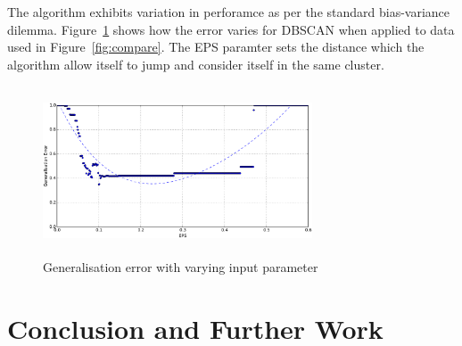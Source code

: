 \documentclass{ecsarticle}     %
\begin{document}
The algorithm exhibits variation in perforamce as per the standard bias-variance dilemma.
Figure~\ref{fig:error} shows how the error varies for DBSCAN when applied to data used in Figure~\ref{fig:compare}.
The EPS paramter sets the distance which the algorithm allow itself to jump and consider itself in the same cluster.

\begin{figure}[ht]
   \centering
    \includegraphics[height = 5cm,width = 8cm]{error.pdf}
   \caption{Generalisation error with varying input parameter}
   \label{fig:error}
\end{figure}




\section{Conclusion and Further Work}




\end{document}
